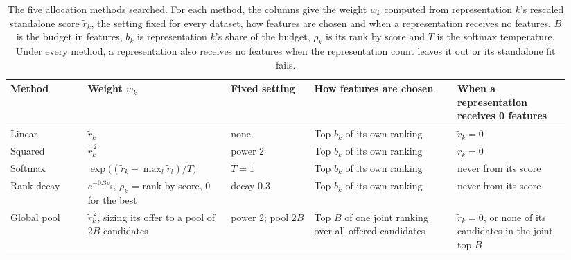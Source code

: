 \begin{table}[htbp]
\centering
\caption[The five allocation methods searched.]{The five allocation methods searched. For each method, the columns give the weight $w_k$ computed from representation $k$'s rescaled standalone score $\tilde r_k$, the setting fixed for every dataset, how features are chosen and when a representation receives no features. $B$ is the budget in features, $b_k$ is representation $k$'s share of the budget, $\rho_k$ is its rank by score and $T$ is the softmax temperature. Under every method, a representation also receives no features when the representation count leaves it out or its standalone fit fails.}
\label{tab:alloc_methods}
\small
\begin{adjustbox}{max width=\textwidth}
\begin{tabular}{@{}P{0.13\linewidth}P{0.24\linewidth}P{0.14\linewidth}P{0.24\linewidth}P{0.19\linewidth}@{}}
\toprule
Method & Weight $w_k$ & Fixed setting & How features are chosen & When a representation receives 0 features \\
\midrule
Linear & $\tilde r_k$ & none & Top $b_k$ of its own ranking & $\tilde r_k = 0$ \\
Squared & $\tilde r_k^{\,2}$ & power 2 & Top $b_k$ of its own ranking & $\tilde r_k = 0$ \\
Softmax & $\exp\big((\tilde r_k - \max_l \tilde r_l)/T\big)$ & $T = 1$ & Top $b_k$ of its own ranking & never from its score \\
Rank decay & $e^{-0.3\rho_k}$, $\rho_k$ = rank by score, 0 for the best & decay 0.3 & Top $b_k$ of its own ranking & never from its score \\
Global pool & $\tilde r_k^{\,2}$, sizing its offer to a pool of $2B$ candidates & power 2; pool $2B$ & Top $B$ of one joint ranking over all offered candidates & $\tilde r_k = 0$, or none of its candidates in the joint top $B$ \\
\bottomrule
\end{tabular}
\end{adjustbox}
\end{table}

